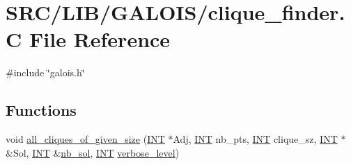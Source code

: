 \hypertarget{clique__finder_8_c}{}\section{S\+R\+C/\+L\+I\+B/\+G\+A\+L\+O\+I\+S/clique\+\_\+finder.C File Reference}
\label{clique__finder_8_c}
{\ttfamily \#include \char`\"{}galois.\+h\char`\"{}}\newline
\subsection*{Functions}
\begin{DoxyCompactItemize}
\item 
void \mbox{\hyperlink{clique__finder_8_c_a6d34203fee35b94a881e8976dd9b842c}{all\+\_\+cliques\+\_\+of\+\_\+given\+\_\+size}} (\mbox{\hyperlink{galois_8h_a09fddde158a3a20bd2dcadb609de11dc}{I\+NT}} $\ast$Adj, \mbox{\hyperlink{galois_8h_a09fddde158a3a20bd2dcadb609de11dc}{I\+NT}} nb\+\_\+pts, \mbox{\hyperlink{galois_8h_a09fddde158a3a20bd2dcadb609de11dc}{I\+NT}} clique\+\_\+sz, \mbox{\hyperlink{galois_8h_a09fddde158a3a20bd2dcadb609de11dc}{I\+NT}} $\ast$\&Sol, \mbox{\hyperlink{galois_8h_a09fddde158a3a20bd2dcadb609de11dc}{I\+NT}} \&\mbox{\hyperlink{plane__search_8_c_a0029b734487624c93c3a72d74a8f2bf9}{nb\+\_\+sol}}, \mbox{\hyperlink{galois_8h_a09fddde158a3a20bd2dcadb609de11dc}{I\+NT}} \mbox{\hyperlink{simeon_8_c_a818073fbcc2f439e7c56952f67386122}{verbose\+\_\+level}})
\end{DoxyCompactItemize}
